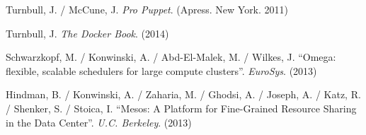 \documentclass[a4paper,12pt,spanish,final]{epsc_tfc_pfc}
\begin{document}
\begin{thebibliography}{2}


Turnbull, J. / McCune, J.
{\it Pro Puppet}.
(Apress. New York. 2011)

Turnbull, J.
{\it The Docker Book}.
(2014)

Schwarzkopf, M. / Konwinski, A. / Abd-El-Malek, M. / Wilkes, J.
``Omega: flexible, scalable schedulers for large compute clusters''. {\it EuroSys}.
(2013)

Hindman, B. / Konwinski, A. / Zaharia, M. / Ghodsi, A. / Joseph, A. / Katz, R. / Shenker, S. / Stoica, I.
``Mesos: A Platform for Fine-Grained Resource Sharing in the Data Center''. {\it U.C. Berkeley}.
(2013)

\end{thebibliography}
\end{document}
